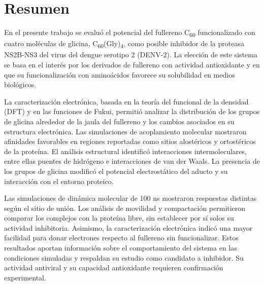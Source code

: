 \titleformat{\chapter}[display]
  {\normalfont\bfseries}{}{0pt}{\Large}
\chapter{Resumen}
En el presente trabajo se evaluó el potencial del fullereno C\textsubscript{60} funcionalizado con cuatro moléculas de glicina, C\textsubscript{60}(Gly)\textsubscript{4}, como posible inhibidor de la proteasa NS2B-NS3 del virus del dengue serotipo 2 (DENV-2). La elección de este sistema se basa en el interés por los derivados de fullereno con actividad antioxidante y en que su funcionalización con aminoácidos favorece su solubilidad en medios biológicos.

La caracterización electrónica, basada en la teoría del funcional de la densidad (DFT) y en las funciones de Fukui, permitió analizar la distribución de los grupos de glicina alrededor de la jaula del fullereno y los cambios asociados en su estructura electrónica. Las simulaciones de acoplamiento molecular mostraron afinidades favorables en regiones reportadas como sitios alostéricos y ortostéricos de la proteína. El análisis estructural identificó interacciones intermoleculares, entre ellas puentes de hidrógeno e interacciones de van der Waals. La presencia de los grupos de glicina modificó el potencial electrostático del aducto y su interacción con el entorno proteico.

Las simulaciones de dinámica molecular de 100 ns mostraron respuestas distintas según el sitio de unión. Los análisis de movilidad y compactación permitieron comparar los complejos con la proteína libre, sin establecer por sí solos su actividad inhibitoria. Asimismo, la caracterización electrónica indicó una mayor facilidad para donar electrones respecto al fullereno sin funcionalizar. Estos resultados aportan información sobre el comportamiento del sistema en las condiciones simuladas y respaldan su estudio como candidato a inhibidor. Su actividad antiviral y su capacidad antioxidante requieren confirmación experimental.

